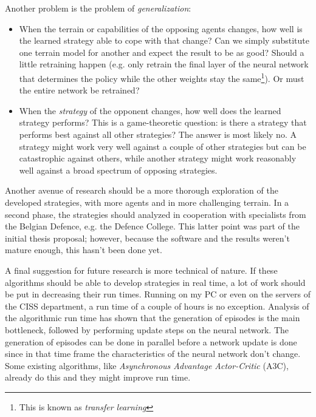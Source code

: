 Another problem is the problem of \emph{generalization}:
\begin{itemize}
    \item When the terrain or capabilities of the opposing agents changes, how well is the learned strategy able to cope with that change? Can we simply substitute one terrain model for another and expect the result to be as good? Should a little retraining happen (e.g. only retrain the final layer of the neural network that determines the policy while the other weights stay the same\footnote{This is known as \emph{transfer learning}}). Or must the entire network be retrained?
    \item When the \emph{strategy} of the opponent changes, how well does the learned strategy performs? This is a game-theoretic question: is there a strategy that performs best against all other strategies? The answer is most likely no. A strategy might work very well against a couple of other strategies but can be catastrophic against others, while another strategy might work reasonably well against a broad spectrum of opposing strategies.
\end{itemize}

Another avenue of research should be a more thorough exploration of the developed strategies, with more agents and in more challenging terrain. In a second phase, the strategies should analyzed in cooperation with specialists from the Belgian Defence, e.g. the Defence College. This latter point was part of the initial thesis proposal; however, because the software and the results weren't mature enough, this hasn't been done yet.

A final suggestion for future research is more technical of nature. If these algorithms should be able to develop strategies in real time, a lot of work should be put in decreasing their run times. Running on my PC or even on the servers of the CISS department, a run time of a couple of hours is no exception. Analysis of the algorithmic run time has shown that the generation of episodes is the main bottleneck, followed by performing update steps on the neural network. The generation of episodes can be done in parallel before a network update is done since in that time frame the characteristics of the neural network don't change. Some existing algorithms, like \emph{Asynchronous Advantage Actor-Critic} (A3C)\cite{mnih2016asynchronous}, already do this and they might improve run time.
